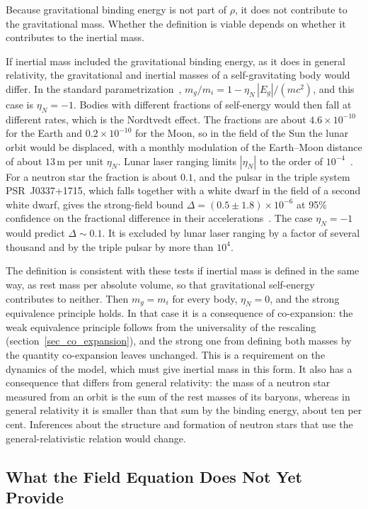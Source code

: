 Because gravitational binding energy is not part of $\rho$, it does not contribute to the gravitational mass. Whether the definition is viable depends on whether it contributes to the inertial mass.

If inertial mass included the gravitational binding energy, as it does in general relativity, the gravitational and inertial masses of a self-gravitating body would differ. In the standard parametrization~\cite{Will2014}, $m_g/m_i=1-\eta_N\,|E_g|/(mc^2)$, and this case is $\eta_N=-1$. Bodies with different fractions of self-energy would then fall at different rates, which is the Nordtvedt effect. The fractions are about $4.6\times10^{-10}$ for the Earth and $0.2\times10^{-10}$ for the Moon, so in the field of the Sun the lunar orbit would be displaced, with a monthly modulation of the Earth--Moon distance of about $13$\,m per unit $\eta_N$. Lunar laser ranging limits $|\eta_N|$ to the order of $10^{-4}$~\cite{Will2014}. For a neutron star the fraction is about $0.1$, and the pulsar in the triple system PSR~J0337+1715, which falls together with a white dwarf in the field of a second white dwarf, gives the strong-field bound $\Delta=(0.5\pm1.8)\times10^{-6}$ at 95\% confidence on the fractional difference in their accelerations~\cite{Voisin2020}. The case $\eta_N=-1$ would predict $\Delta\sim0.1$. It is excluded by lunar laser ranging by a factor of several thousand and by the triple pulsar by more than $10^4$.

The definition is consistent with these tests if inertial mass is defined in the same way, as rest mass per absolute volume, so that gravitational self-energy contributes to neither. Then $m_g=m_i$ for every body, $\eta_N=0$, and the strong equivalence principle holds. In that case it is a consequence of co-expansion: the weak equivalence principle follows from the universality of the rescaling (section~\ref{sec_co_expansion}), and the strong one from defining both masses by the quantity co-expansion leaves unchanged. This is a requirement on the dynamics of the model, which must give inertial mass in this form. It also has a consequence that differs from general relativity: the mass of a neutron star measured from an orbit is the sum of the rest masses of its baryons, whereas in general relativity it is smaller than that sum by the binding energy, about ten per cent. Inferences about the structure and formation of neutron stars that use the general-relativistic relation would change.

\subsection{What the Field Equation Does Not Yet Provide}

